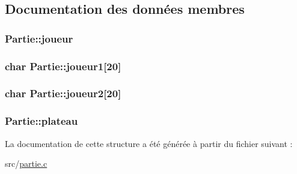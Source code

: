 \subsection{\-Documentation des données membres}
\hypertarget{structPartie_a8b5c0c007da53d6d723f4300a1d9d4ad}{
\subsubsection[{joueur}]{ {\bf \-Partie\-::joueur}}}\label{structPartie_a8b5c0c007da53d6d723f4300a1d9d4ad}
\hypertarget{structPartie_a42905bbdce5ccfd367a1b4195a433e01}{
\subsubsection[{joueur1}]{\setlength{\rightskip}{0pt plus 5cm}char {\bf \-Partie\-::joueur1}\mbox{[}20\mbox{]}}}\label{structPartie_a42905bbdce5ccfd367a1b4195a433e01}
\hypertarget{structPartie_a90dd0f2162050b2f3169dcb860d975cf}{
\subsubsection[{joueur2}]{\setlength{\rightskip}{0pt plus 5cm}char {\bf \-Partie\-::joueur2}\mbox{[}20\mbox{]}}}\label{structPartie_a90dd0f2162050b2f3169dcb860d975cf}
\hypertarget{structPartie_ae8a9b67f286f8bfd3e3a574f0ac2ac67}{
\subsubsection[{plateau}]{ {\bf \-Partie\-::plateau}}}\label{structPartie_ae8a9b67f286f8bfd3e3a574f0ac2ac67}


\-La documentation de cette structure a été générée à partir du fichier suivant \-:\begin{DoxyCompactItemize}
\item 
src/\hyperlink{partie_8c}{partie.\-c}\end{DoxyCompactItemize}
